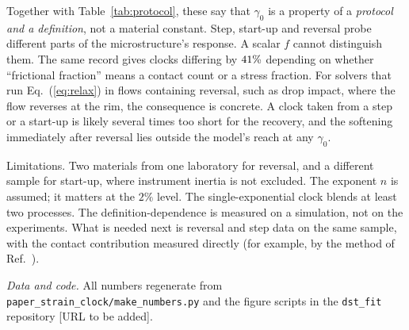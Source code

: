\documentclass[aps,pre,reprint,superscriptaddress,nofootinbib]{revtex4-2}
\begin{document}
Together with Table~\ref{tab:protocol}, these say that $\gamma_0$ is a property of a \emph{protocol and a definition},
not a material constant. Step, start-up and reversal probe different parts of the
microstructure's response. A scalar $f$ cannot distinguish them. The same record gives
clocks differing by $41\%$ depending on whether ``frictional fraction'' means a
contact count or a stress fraction. For solvers that run Eq.~(\ref{eq:relax}) in flows
containing reversal, such as drop impact, where the flow reverses at the rim, the
consequence is concrete. A clock taken from a step or a start-up is likely several times too
short for the recovery, and the softening immediately after reversal lies outside the
model's reach at any $\gamma_0$.

Limitations. Two materials from one laboratory for reversal, and a different sample for start-up, where instrument inertia is not excluded. The exponent $n$ is assumed; it matters at
the $2\%$ level. The single-exponential clock blends at least two processes. The
definition-dependence is measured on a simulation, not on the experiments. What is needed
next is reversal and step data on the same sample, with the contact contribution
measured directly (for example, by the method of Ref.~\cite{Lin2015}).

\emph{Data and code.} All numbers regenerate from \texttt{paper\_strain\_clock/make\_numbers.py}
and the figure scripts in the \texttt{dst\_fit} repository [URL to be added].


\end{document}
